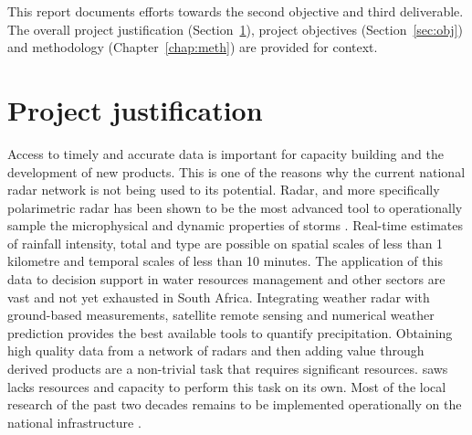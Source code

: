 \documentclass{wrcreport}
\begin{document}
This report documents efforts towards the second objective and third
deliverable. The overall project justification
(Section~\ref{sec:just}), project objectives (Section~\ref{sec:obj})
and methodology (Chapter~\ref{chap:meth}) are provided for context.

\section{Project justification} \label{sec:just}

Access to timely and accurate data is important for capacity building
and the development of new products. This is one of the reasons why
the current national radar network is not being used to its potential.
Radar, and more specifically polarimetric radar has been shown to be
the most advanced tool to operationally sample the microphysical and
dynamic properties of storms \citep{Hall1984, Bringi1986, Straka2000a,
Bringi2002, Gorgucci2002}.  Real-time estimates of rainfall intensity,
total and type are possible on spatial scales of less than 1 kilometre
and temporal scales of less than 10 minutes. The application of this
data to decision support in water resources management and other
sectors are vast and not yet exhausted in South Africa. Integrating
weather radar with ground-based measurements, satellite remote sensing
and numerical weather prediction provides the best available tools to
quantify precipitation. Obtaining high quality data from a network of
radars and then adding value through derived products are a
non-trivial task that requires significant resources. \gls{saws} lacks
resources and capacity to perform this task on its own. Most of the
local research of the past two decades remains to be implemented
operationally on the national infrastructure
\citep{Mittermaier2000,Pegram2001, Terblanche2001a, Terblanche2001b,
Clothier2002, Pegram2002, Kroese2004, Kroese2006, Sinclair2004,
Sinclair2005, Sinclair2009, Wesson2006, Vischel2007, Vischel2008}.
\end{document}
